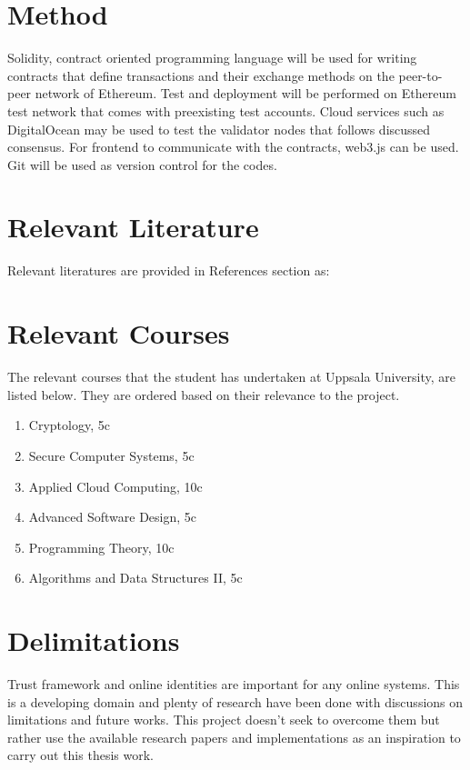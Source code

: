 \documentclass[a4paper,11pt,dvipsnames]{article}
\begin{document}
	\section*{Method}
	Solidity, \cite{solidity} contract oriented programming language will be 
	used for writing contracts that define transactions and their exchange 
	methods on the peer-to-peer network of Ethereum. \cite{ethereum_whitepaper} 
	Test and deployment will be performed on Ethereum test network that comes 
	with preexisting test accounts. Cloud services such as DigitalOcean may 
	be used to test the validator nodes that follows discussed consensus. For 
	frontend to communicate with the contracts, web3.js can be used. Git will 
	be used as version control for the codes.
	\section*{Relevant Literature}
	Relevant literatures are provided in References section as:
	\cite{literature1} \cite{literature2} \cite{ilprints562}

	\section*{Relevant Courses}
	The relevant courses that the student has undertaken at Uppsala University, 
	are listed below. They are ordered based on their relevance to the project.
	\begin{enumerate}
		\item Cryptology, 5c
		\item Secure Computer Systems, 5c
		\item Applied Cloud Computing, 10c
		\item Advanced Software Design, 5c
		\item Programming Theory, 10c
		\item Algorithms and Data Structures II, 5c
	\end{enumerate}

	\section*{Delimitations}
	Trust framework and online identities are important for any online systems. 
	This is a developing domain and plenty of research have been done with 
	discussions on limitations and future works. This project doesn’t seek to 
	overcome them but rather use the available research papers and 
	implementations as an inspiration to carry out this thesis work.
	
\end{document}
